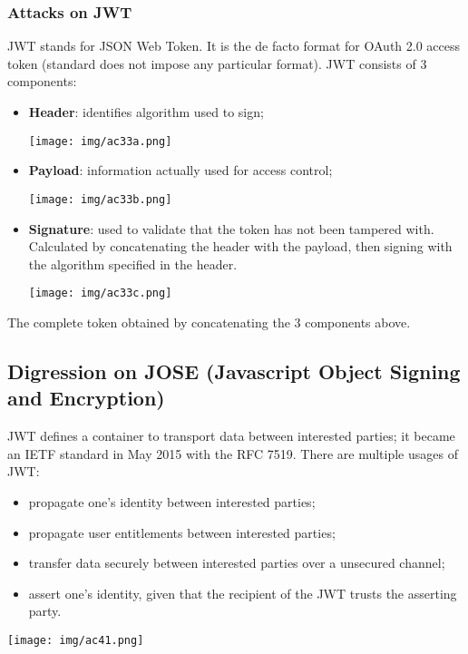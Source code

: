 \documentclass[a4paper, 10pt, titlepage]{article}
\begin{document}
\subsubsection{Attacks on JWT}
JWT stands for JSON Web Token. It is the de facto format for OAuth 2.0 access token (standard does not impose any particular format).
JWT consists of 3 components:
\begin{itemize}
\item \textbf{Header}: identifies algorithm used to sign;
\begin{center}
\texttt{[image: img/ac33a.png]}
\end{center}
\item \textbf{Payload}: information actually used for access control;
\begin{center}
\texttt{[image: img/ac33b.png]}
\end{center}
\item \textbf{Signature}: used to validate that the token has not been tampered with. Calculated by concatenating the header with the payload, then signing with the algorithm specified in the header.
\begin{center}
\texttt{[image: img/ac33c.png]}
\end{center}
\end{itemize}
The complete token obtained by concatenating the 3 components above.


\subsection{Digression on JOSE (Javascript Object Signing and Encryption)} %
JWT defines a container to transport data between interested parties; it became an IETF standard in May 2015 with the RFC 7519. There are multiple usages of JWT:
\begin{itemize}
\item propagate one’s identity between interested parties;
\item propagate user entitlements between interested parties;
\item transfer data securely between interested parties over a unsecured channel;
\item assert one’s identity, given that the recipient of the JWT trusts the asserting party.
\end{itemize}
\begin{center}
\texttt{[image: img/ac41.png]}
\end{center}
\end{document}
